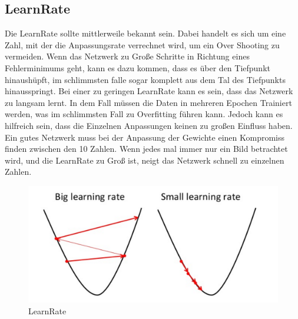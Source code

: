 \documentclass[12pt]{article}
\begin{document}
\subsection{LearnRate}
Die LearnRate sollte mittlerweile bekannt sein. Dabei handelt es sich um eine Zahl, mit der die Anpassungsrate verrechnet wird, um ein Over Shooting zu vermeiden. Wenn das Netzwerk zu Große Schritte in Richtung eines Fehlerminimums geht, kann es dazu kommen, dass es über den Tiefpunkt hinaushüpft, im schlimmsten falle sogar komplett aus dem Tal des Tiefpunkts hinausspringt. Bei einer zu geringen LearnRate kann es sein, dass das Netzwerk zu langsam lernt. In dem Fall müssen die Daten in mehreren Epochen Trainiert werden, was im schlimmsten Fall zu Overfitting führen kann. Jedoch kann es hilfreich sein, dass die Einzelnen Anpassungen keinen zu großen Einfluss haben. Ein gutes Netzwerk muss bei der Anpassung der Gewichte einen Kompromiss finden zwischen den 10 Zahlen. Wenn jedes mal immer nur ein Bild betrachtet wird, und die LearnRate zu Groß ist, neigt das Netzwerk schnell zu einzelnen Zahlen.
\begin{figure}[H]
\centering
\includegraphics[scale=0.250]{./Images/Pasted image 20230917181526.png}
\caption{LearnRate}
\label{Was kommt hier rein?}
\end{figure}
\end{document}
